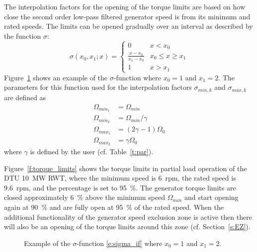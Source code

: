 \begin{sidewaysfigure}
\centerline{ }
\caption{Diagram of the discrete controller. Note that $k$ denotes the current time step. \label{f:diagram}}
\end{sidewaysfigure}

The interpolation factors for the opening of the torque limits are based on how close the second order low-pass filtered generator speed is from its minimum and rated speeds. The limits can be opened gradually over an interval as described by the function $\sigma$:
\begin{equation}\label{e:sigma_if}
\sigma\left(x_0,x_1;x\right) = \left\{
\begin{array}{rl}
0 & x < x_0 \\
\frac{x - x_0}{x_1 - x_0} & x_0 \le x \ge x_1 \\
1 & x > x_1
\end{array} \right.
\end{equation}
Figure~\ref{f:sigma} shows an example of the $\sigma$-function where $x_0=1$ and $x_1=2$. The parameters for this function used for the interpolation factors $\sigma_{min,k}$ and $\sigma_{max,k}$ are defined as
\begin{align}
\nonumber
\Omega_{min_1} &= \Omega_{min} \\
\nonumber
\Omega_{min_2} &= \Omega_{min}/\gamma \\
\label{e:percentage}
\Omega_{max_1} &= \left(2 \gamma - 1 \right) \Omega_0 \\
\nonumber
\Omega_{max_2} &= \gamma \Omega_0
\end{align}
where $\gamma$ is defined by the user (cf. Table~\ref{t:par}). 

Figure~\ref{f:torque_limits} shows the torque limits in partial load operation of the DTU 10~MW RWT, where the minimum speed is 6~rpm, the rated speed is 9.6~rpm, and the percentage is set to 95~\%. The generator torque limits are closed approximately 6~\% above the minimum speed $\Omega_{min}$ and start opening again at 90~\% and are fully open at 95~\% of the rated speed. When the additional functionality of the generator speed exclusion zone is active then there will also be an opening of the torque limits around this zone (cf. Section~\ref{s:EZ}).

\begin{figure}[t]
\centerline{ }
\caption{Example of the $\sigma$-function \eqref{e:sigma_if} where $x_0=1$ and $x_1=2$. \label{f:sigma}}
\end{figure}

